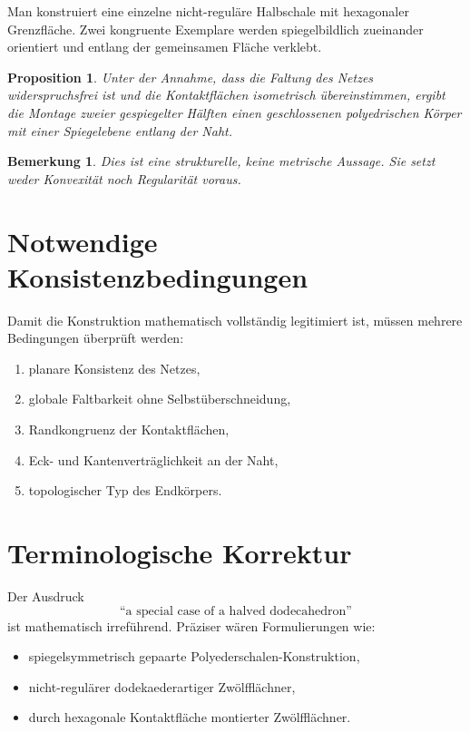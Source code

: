 \documentclass[11pt]{article}
\newtheorem{proposition}[satz]{Proposition}
\newtheorem{bemerkung}[satz]{Bemerkung}
\begin{document}
	Man konstruiert eine einzelne nicht-reguläre Halbschale mit hexagonaler Grenzfläche. Zwei kongruente Exemplare werden spiegelbildlich zueinander orientiert und entlang der gemeinsamen Fläche verklebt.
	
	\begin{proposition}
		Unter der Annahme, dass die Faltung des Netzes widerspruchsfrei ist und die Kontaktflächen isometrisch übereinstimmen, ergibt die Montage zweier gespiegelter Hälften einen geschlossenen polyedrischen Körper mit einer Spiegelebene entlang der Naht.
	\end{proposition}
	
	\begin{bemerkung}
		Dies ist eine strukturelle, keine metrische Aussage. Sie setzt weder Konvexität noch Regularität voraus.
	\end{bemerkung}
	
	\section{Notwendige Konsistenzbedingungen}
	
	Damit die Konstruktion mathematisch vollständig legitimiert ist, müssen mehrere Bedingungen überprüft werden:
	\begin{enumerate}
		\item planare Konsistenz des Netzes,
		\item globale Faltbarkeit ohne Selbstüberschneidung,
		\item Randkongruenz der Kontaktflächen,
		\item Eck- und Kantenverträglichkeit an der Naht,
		\item topologischer Typ des Endkörpers.
	\end{enumerate}
	
	\section{Terminologische Korrektur}
	
	Der Ausdruck
	\[
	\text{``a special case of a halved dodecahedron''}
	\]
	ist mathematisch irreführend. Präziser wären Formulierungen wie:
	\begin{itemize}
		\item spiegelsymmetrisch gepaarte Polyederschalen-Konstruktion,
		\item nicht-regulärer dodekaederartiger Zwölfflächner,
		\item durch hexagonale Kontaktfläche montierter Zwölfflächner.
	\end{itemize}
	
\end{document}
